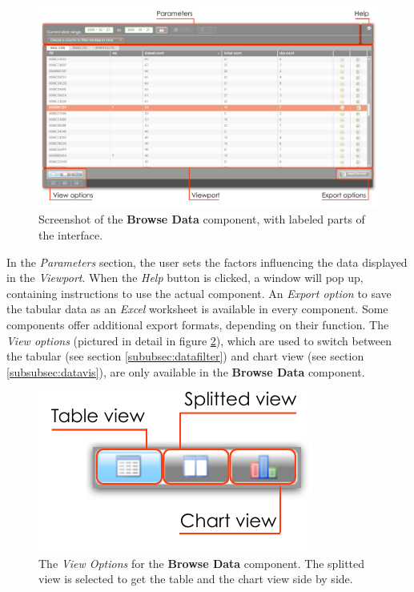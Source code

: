 \begin{figure}[!htbp]
\begin{center}
  \includegraphics[width=\textwidth]{assets/pdf/interface_component.pdf}
  \caption[Browse Data component interface]{Screenshot of the \textbf{Browse Data} component, with labeled parts of the interface.}
  \label{fig:interface_component}
\end{center}
\end{figure}

In the \textit{Parameters} section, the user sets the factors influencing the data displayed in the \textit{Viewport}. When the \textit{Help} button is clicked, a window will pop up, containing instructions to use the actual component. An \textit{Export option} to save the tabular data as an \textit{Excel} worksheet is available in every component. Some components offer additional export formats, depending on their function. The \textit{View options} (pictured in detail in figure \ref{fig:view_options}), which are used to switch between the tabular (see section \ref{sububsec:datafilter}) and chart view (see section \ref{subsubsec:datavis}), are only available in the \textbf{Browse Data} component.

\begin{figure}[htpb]
\begin{center}
	\includegraphics[width=.3\textwidth]{assets/pdf/view_options.pdf}
	\caption[View options]{The \textit{View Options} for the \textbf{Browse Data} component. The splitted view is selected to get the table and the chart view side by side.}
	\label{fig:view_options}
\end{center}
\end{figure}    


